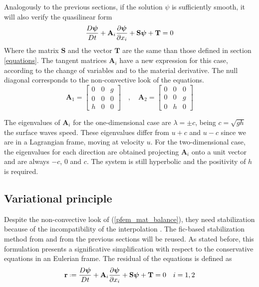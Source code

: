 Analogously to the previous sections, if the solution $\psi$ is sufficiently smooth, it will also verify the quasilinear form
\begin{equation} \label{pfem_mat_balance_lin}
    \frac{D\bm{\psi}}{Dt} + \mathbf{A}_i\frac{\partial\bm{\psi}}{\partial x_i} + \mathbf{S}\bm{\psi} + \mathbf{T} = 0
\end{equation}
Where the matrix $\mathbf{S}$ and the vector $\mathbf{T}$ are the same than those defined in section \ref{equations}. The tangent matrices $\mathbf{A}_i$ have a new expression for this case, according to the change of variables and to the material derivative. The null diagonal corresponds to the non-convective look of the equations.
\begin{equation}
    \mathbf{A}_1 = \left[\begin{array}{ccc}
        0 & 0 & g \\
        0 & 0 & 0 \\
        h & 0 & 0
    \end{array}\right] \quad , \quad
    \mathbf{A}_2 = \left[\begin{array}{ccc}
        0 & 0 & 0 \\
        0 & 0 & g \\
        0 & h & 0
    \end{array}\right]
\end{equation}


The eigenvalues of $\mathbf{A}_i$ for the one-dimensional case are $\lambda = \pm c$, being $c=\sqrt{gh}$ the surface waves speed. These eigenvalues differ from $u+c$ and $u-c$ since we are in a Lagrangian frame, moving at velocity $u$.
For the two-dimensional case, the eigenvalues for each direction are obtained projecting $\mathbf{A}_i$ onto a unit vector and are always $-c$, $0$ and $c$.
The system is still hyperbolic and the positivity of $h$ is required. 




\subsection{Variational principle}


Despite the non-convective look of (\ref{pfem_mat_balance}), they need stabilization because of the incompatibility of the interpolation \cite{codina2008}. The fic-based stabilization method from \cite{onate1998} and from the previous sections will be reused. As stated before, this formulation presents a significative simplification with respect to the conservative equations in an Eulerian frame. The residual of the equations is defined as
\begin{equation}
    \mathbf{r} \defeq \frac{D\bm{\psi}}{Dt} + \mathbf{A}_i\pder{\bm{\psi}}{x_i} + \mathbf{S}\bm{\psi} + \mathbf{T} = 0 \quad i = 1,2
\end{equation}

